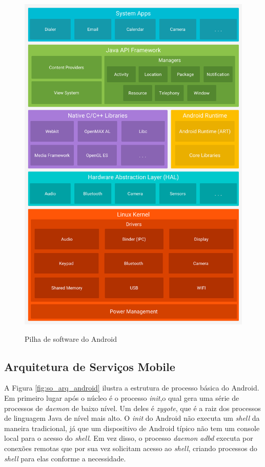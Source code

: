 \begin{figure}[htb]
    \caption{Pilha de software do Android}
    \centering
    \begin{frame}{
    \includegraphics  [scale=0.2,]{img/arq_doc_android.png}}
    \end{frame}
    \label{fig:so_arq_dev_android}
\end{figure}

\newpage

\subsection{Arquitetura de Serviços Mobile}
A Figura \ref{fig:so_arq_android} ilustra a estrutura de processo básica do Android. Em primeiro lugar após o núcleo é o processo \textit{init},o qual gera uma série de processos de \textit{daemon} de baixo nível. Um deles é \textit{zygote}, que é a raiz dos processos de linguagem Java de nível mais alto. O \textit{init} do Android não executa um \textit{shell} da maneira tradicional, já que um dispositivo de Android típico não tem um console local para o acesso do \textit{shell}. Em vez disso, o processo \textit{daemon adbd} executa por conexões remotas que por sua vez  solicitam acesso ao \textit{shell}, criando processos do \textit{shell} para elas conforme a necessidade.

